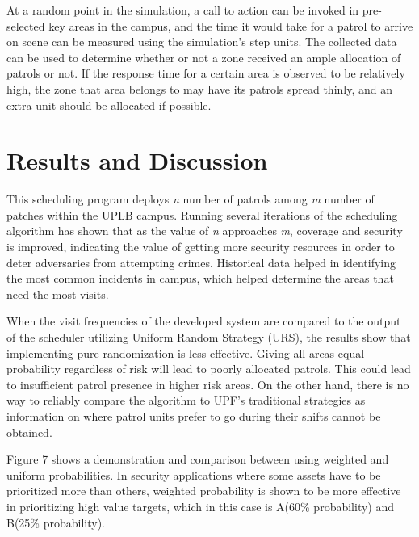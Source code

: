 \documentclass[journal]{./IEEE/IEEEtran}
\begin{document}
At a random point in the simulation, a call to action can be invoked in pre-selected key areas in the campus, and the time it would take for a patrol to arrive on scene can be measured using the simulation's step units. The collected data can be used to determine whether or not a zone received an ample allocation of patrols or not. If the response time for a certain area is observed to be relatively high, the zone that area belongs to may have its patrols spread thinly, and an extra unit should be allocated if possible.

\section{Results and Discussion}
This scheduling program deploys \textit{n} number of patrols among \textit{m} number of patches within the UPLB campus. Running several iterations of the scheduling algorithm has shown that as the value of \textit{n} approaches \textit{m}, coverage and security is improved, indicating the value of getting more security resources in order to deter adversaries from attempting crimes. Historical data helped in identifying the most common incidents in campus, which helped determine the areas that need the most visits.


When the visit frequencies of the developed system are compared to the output of the scheduler utilizing Uniform Random Strategy (URS), the results show that implementing pure randomization is less effective. Giving all areas equal probability regardless of risk will lead to poorly allocated patrols. This could lead to insufficient patrol presence in higher risk areas. On the other hand, there is no way to reliably compare the algorithm to UPF's traditional strategies as information on where patrol units prefer to go during their shifts cannot be obtained.

Figure 7 shows a demonstration and comparison between using weighted and uniform probabilities. In security applications where some assets have to be prioritized more than others, weighted probability is shown to be more effective in prioritizing high value targets, which in this case is A(60\% probability) and B(25\% probability).
\end{document}
